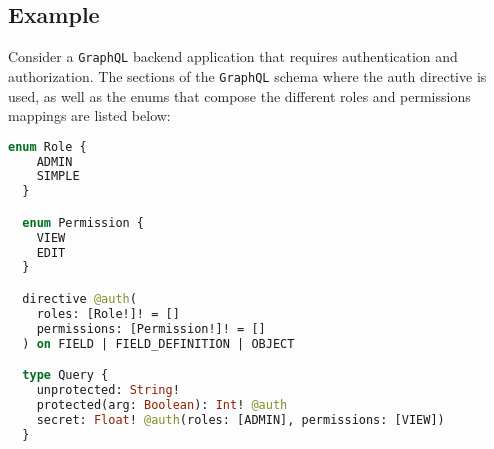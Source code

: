 \subsection{Example}
\label{subsec:corollary_projects_graphql_auth_diretive_example}

Consider a \texttt{GraphQL} backend application that requires authentication and
authorization. The sections of the \texttt{GraphQL} schema where the auth directive
is used, as well as the enums that compose the different roles and permissions
mappings are listed below:

\begin{lstlisting}[language=graphql, morekeywords={[2]{@auth, Role, Permission}}, morekeywords={[3]{ADMIN, SIMPLE, VIEW, EDIT}}, morekeywords={[4]{roles, permissions, unprotected, protected, secret, arg}}, xleftmargin=\parindent, caption=\texttt{GraphQL} schema with auth directive and mappings]
  enum Role {
    ADMIN
    SIMPLE
  }

  enum Permission {
    VIEW
    EDIT
  }

  directive @auth(
    roles: [Role!]! = []
    permissions: [Permission!]! = []
  ) on FIELD | FIELD_DEFINITION | OBJECT

  type Query {
    unprotected: String!
    protected(arg: Boolean): Int! @auth
    secret: Float! @auth(roles: [ADMIN], permissions: [VIEW])
  }
\end{lstlisting}

